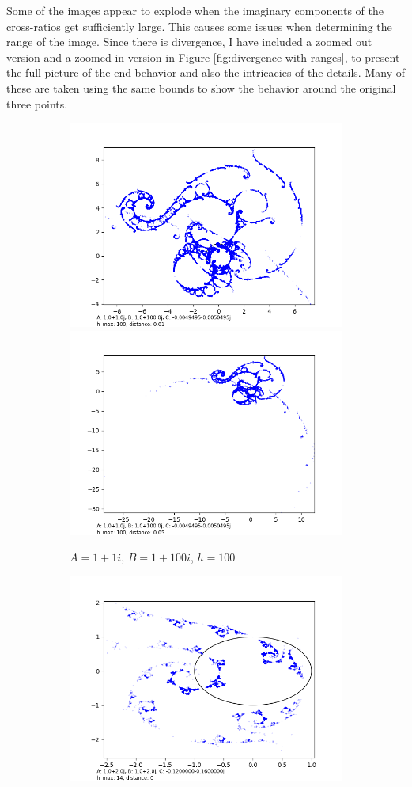 \documentclass[12pt,a4paper,reqno,parskip=full]{amsart}
\numberwithin{equation}{section}
\theoremstyle{plain}
\theoremstyle{definition}
\begin{document}
Some of the images appear to explode when the imaginary components of the cross-ratios get sufficiently large. This causes some issues when determining the range of the image. Since there is divergence, I have included a zoomed out version and a zoomed in version in Figure \ref{fig:divergence-with-ranges}, to present the full picture of the end behavior and also the intricacies of the details. Many of these are taken using the same bounds to show the behavior around the original three points.

\begin{figure}[H]
     \centering
     
     \begin{subfigure}[b]{\textwidth}
         \centering
         \includegraphics[width=.49\textwidth]{images/a1,b100,h100,d.01 custom xy.png}       
         \includegraphics[width=.49\textwidth]{images/a1,b100,h100,d.05.png}
         \caption{$A=1+1i$, $B=1+100i$, $h=100$}
         \label{fig:a1b100range}
     \end{subfigure}
     \begin{subfigure}[b]{\textwidth}
         \centering
        \includegraphics[width=.49\textwidth]{images/a2b2/a2,b2,h14,d0 custom bounds.png}

\end{subfigure}
\end{figure}
\end{document}
